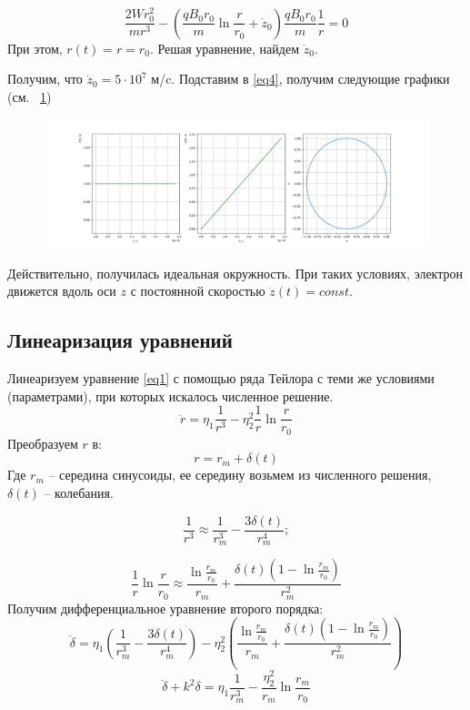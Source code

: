 \begin{equation}
    \frac{2W r^2_0}{m r^3} - \left(\frac{q B_0 r_0}{m} \ln{\frac{r}{r_0}} + \dot{z}_0 \right) \frac{qB_0 r_0}{m} \frac{1}{r} = 0
\end{equation}
При этом, $r(t) = r = r_0$. Решая уравнение, найдем $\dot{z}_0$.
\par
Получим, что $\dot{z}_0 = 5 \cdot 10^{7}$ м/c.
Подставим в  \eqref{eq4}, получим следующие графики (см. ~\ref{fig:2})
\begin{figure}[h]
    \centering
    \includegraphics[width=1\linewidth]{../prog/Figure_2.png}\caption{}\label{fig:2}
\end{figure}
\par
Действительно, получилась идеальная окружность. При таких условиях, электрон движется вдоль оси $z$ с постоянной скоростью $\dot{z}(t) = const$.



\newpage
\subsection{Линеаризация уравнений }
Линеаризуем уравнение \eqref{eq1} с помощью ряда Тейлора с теми же условиями (параметрами), при которых искалось численное решение.
\begin{equation}
    \ddot{r}=\eta_1 \frac{1}{r^3} - \eta_2^2 \frac{1}{r} \ln{\frac{r}{r_0}}   
\end{equation}
Преобразуем $r$ в:
\begin{equation}
    r = r_m + \delta(t)    
\end{equation}
Где $r_m$ -- середина синусоиды, ее середину возьмем из численного решения, $\delta(t)$ -- колебания. 

\begin{equation}
    \frac{1}{r^3} \approx \frac{1}{r_m^3} - \frac{3\delta(t)}{r_m^4};   
\end{equation}

\begin{equation}
    \frac{1}{r} \ln{\frac{r}{r_0}} \approx \frac{\ln{\frac{r_m}{r_0}}}{r_m} + \frac{\delta(t) (1 - \ln{{\frac{r_m}{r_0}}})}{r_m^2}   
\end{equation}
Получим дифференциальное уравнение второго порядка:
\begin{equation}
    \ddot{\delta} = \eta_1 \left( \frac{1}{r_m^3} - \frac{3\delta(t)}{r_m^4}\right) - \eta_2^2 \left( \frac{\ln{\frac{r_m}{r_0}}}{r_m} + \frac{\delta(t) (1 - \ln{{\frac{r_m}{r_0}}})}{r_m^2}\right)
\end{equation}
\begin{equation}
    \ddot{\delta} + k^2 \delta = \eta_1 \frac{1}{r_m^3} - \frac{\eta_2^2}{r_m}\ln{\frac{r_m}{r_0}}    
\end{equation}

